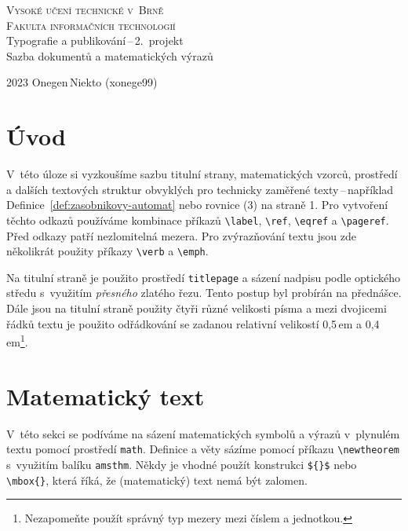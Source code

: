 \documentclass[a4paper, twocolumn, 11pt]{article}
\theoremstyle{plain}
\begin{document}
\begin{titlepage}
	\begin{center}
		{\Huge \textsc{Vysoké učení technické v~Brně}\\[0.5em]}
		{\huge \textsc{Fakulta informačních technologií}}\\
		{\LARGE Typografie a publikování\,--\,2.\ projekt\\[0.4em]
			Sazba dokumentů a matematických výrazů}\\
	\end{center}
	{\Large 2023 \hfill Onegen\,Niekto (xonege99)}
\end{titlepage}

\section*{Úvod}

V~této úloze si vyzkoušíme sazbu titulní strany, mate\-matických vzorců,
prostředí a dalších textových struktur obvyklých pro technicky zaměřené texty\,--\,například
Defi\-nice~\ref{def:zasobnikovy-automat} nebo rovnice (3) na straně 1. Pro vytvoření těchto odkazů
používáme kombinace příkazů \verb|\label|, \verb|\ref|, \verb|\eqref| a \verb|\pageref|.
Před odkazy patří nezlomitelná mezera.
Pro zvýrazňování textu jsou zde několikrát použity příkazy \verb|\verb| a \verb|\emph|.

Na titulní straně je použito prostředí \texttt{titlepage} a sázení nadpisu podle
optického středu s~využitím \emph{přesného} zlatého řezu. Tento postup byl probírán na přednášce.
Dále jsou na titulní straně použity čtyři různé velikosti písma a mezi dvojicemi řádků textu
je použito odřádkování se zadanou relativní velikostí 0,5\,em a
0,4\,em\footnote{Nezapomeňte použít správný typ mezery mezi číslem a jednotkou.}.

\section{Matematický text}

V~této sekci se podíváme na sázení matematických symbolů a výrazů v~plynulém textu pomocí prostředí
\texttt{math}. Definice a věty sázíme pomocí příkazu \verb|\newtheorem| s~využitím balíku
\texttt{amsthm}. Někdy je vhodné použít konstrukci \verb|${}$| nebo \verb|\mbox{}|,
která říká, že (matematický) text nemá být zalomen.
\end{document}
